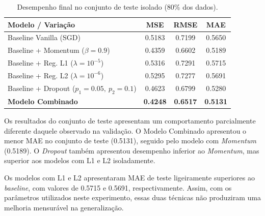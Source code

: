 \documentclass[11pt,a4paper]{article}
\begin{document}
\begin{table}[H]
\centering
\small
\caption{Desempenho final no conjunto de teste isolado (80\% dos dados).}
\label{tab:ablation_test}

\begin{tabularx}{\textwidth}{
    >{\raggedright\arraybackslash}X
    c
    c
    c
}

\toprule

\textbf{Modelo / Variação}
&
\textbf{MSE}
&
\textbf{RMSE}
&
\textbf{MAE}
\\

\midrule

Baseline Vanilla (SGD)
& 0.5183
& 0.7199
& 0.5650
\\

\addlinespace

Baseline + Momentum ($\beta = 0.9$)
& 0.4359
& 0.6602
& 0.5189
\\

\addlinespace

Baseline + Reg. L1 ($\lambda = 10^{-5}$)
& 0.5316
& 0.7291
& 0.5715
\\

\addlinespace

Baseline + Reg. L2 ($\lambda = 10^{-6}$)
& 0.5295
& 0.7277
& 0.5691
\\

\addlinespace

Baseline + Dropout ($p_1 = 0.05,\ p_2 = 0.1$)
& 0.4623
& 0.6799
& 0.5280
\\

\addlinespace

\textbf{Modelo Combinado}
& \textbf{0.4248}
& \textbf{0.6517}
& \textbf{0.5131}
\\

\bottomrule

\end{tabularx}
\end{table}


Os resultados do conjunto de teste apresentam um comportamento parcialmente diferente daquele observado na validação. O Modelo Combinado apresentou o menor MAE no conjunto de teste (0.5131), seguido pelo modelo com \textit{Momentum} (0.5189). O \textit{Dropout} também apresentou desempenho inferior ao \textit{Momentum}, mas superior aos modelos com L1 e L2 isoladamente.

Os modelos com L1 e L2 apresentaram MAE de teste ligeiramente superiores ao \textit{baseline}, com valores de 0.5715 e 0.5691, respectivamente. Assim, com os parâmetros utilizados neste experimento, essas duas técnicas não produziram uma melhoria mensurável na generalização.
\end{document}
